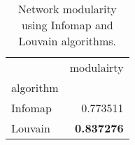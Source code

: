\begin{table}[!htbp]
\centering
\caption{Network modularity using Infomap and Louvain algorithms.}
\label{tab:modularity}
\begin{tabular}{lr}
\toprule
 & modulairty \\
algorithm &  \\
\midrule
Infomap & 0.773511 \\
Louvain & \textbf{0.837276} \\
\bottomrule
\end{tabular}
\end{table}
